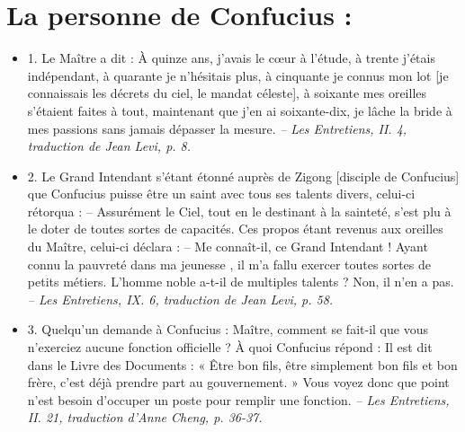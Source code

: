 \section{La personne de Confucius : }

\begin{itemize}

     \item  1. \newline Le Maître a dit : À quinze ans, j’avais le cœur à l’étude, à trente j’étais indépendant, à quarante je n’hésitais plus, à cinquante je connus mon lot [je connaissais les décrets du ciel, le mandat céleste], à soixante mes oreilles s’étaient faites à tout, maintenant que j’en ai soixante-dix, je lâche la bride à mes passions sans jamais dépasser la mesure.   \textit{\small -- Les Entretiens, II. 4, traduction de Jean Levi, p. 8.  } 
\item 2. \newline Le Grand Intendant s’étant étonné auprès de Zigong [disciple de Confucius] que Confucius puisse être un saint avec tous ses talents divers, celui-ci rétorqua :  -- Assurément le Ciel, tout en le destinant à la sainteté, s’est plu à le doter de toutes sortes de capacités. Ces propos étant revenus aux oreilles du Maître, celui-ci déclara :  \newline -- Me connaît-il, ce Grand Intendant ! Ayant connu la pauvreté dans ma jeunesse , il m’a fallu exercer toutes sortes de petits métiers. L’homme noble a-t-il de multiples talents ? Non, il n’en a pas.  \textit{\small -- Les Entretiens, IX. 6, traduction de Jean Levi, p. 58.  }
\item 3. \newline Quelqu’un demande à Confucius : Maître, comment se fait-il que vous n’exerciez aucune fonction officielle ?  À quoi Confucius répond :  Il est dit dans le Livre des Documents : « Être bon fils, être simplement bon fils et bon frère, c’est déjà prendre part au gouvernement. » Vous voyez donc que point n’est besoin d’occuper un poste pour remplir une fonction.  \textit{\small -- Les Entretiens, II. 21, traduction d’Anne Cheng, p. 36-37.  
}
\end{itemize}
